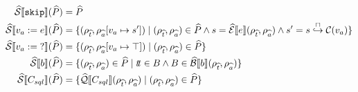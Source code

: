 \begin{align}
    \abssem{\texttt{skip}}(\ab{P}) &= \ab{P} \\
    \abssem{v_a := e}(\ab{P}) &= \{(\env{\abstable}, \env{\absvars}[v_a \mapsto s']) \mid (\env{\abstable}, \env{\absvars}) \in \ab{P} \land s = \absexpsem{e}(\env{\abstable}, \env{\absvars}) \land s' = s \into \lookupcl(v_a) \} \\
    \abssem{v_a := \; ?}(\ab{P}) &= \{(\env{\abstable}, \env{\absvars}[v_a \mapsto \top]) \mid (\env{\abstable}, \env{\absvars}) \in \ab{P} \} \\
    \abssem{b}(\ab{P}) &= \{ (\env{\abstable}, \env{\absvars}) \in \ab{P} \mid \true \in B \land B \in \absboolsem{b}(\env{\abstable}, \env{\absvars}) \} \\
    \abssem{C_{sql}}(\ab{P}) &= \{\abssqlsem{C_{sql}}(\env{\abstable}, \env{\absvars}) \mid (\env{\abstable}, \env{\absvars}) \in \ab{P} \}
\end{align}

